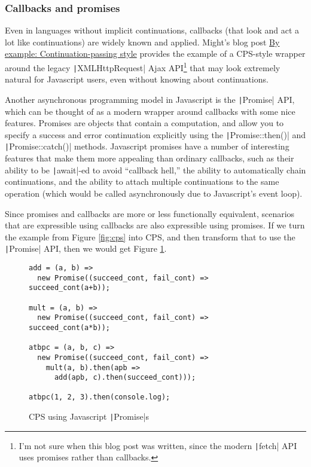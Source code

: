 \documentclass[]{article}
\begin{document}
\subsubsection{Callbacks and promises}
\label{sec:cacb}

Even in languages without implicit continuations, callbacks (that look and act a lot like continuations) are widely known and applied. Might's blog post \href{https://matt.might.net/articles/by-example-continuation-passing-style/}{By example: Continuation-passing style} provides the example of a CPS-style wrapper around the legacy \texttt|XMLHttpRequest| Ajax API\footnote{I'm not sure when this blog post was written, since the modern \texttt|fetch| API uses promises rather than callbacks.} that may look extremely natural for Javascript users, even without knowing about continuations.

Another asynchronous programming model in Javascript is the \texttt|Promise| API, which can be thought of as a modern wrapper around callbacks with some nice features. Promises are objects that contain a computation, and allow you to specify a success and error continuation explicitly using the \texttt|Promise::then()| and \texttt|Promise::catch()| methods. Javascript promises have a number of interesting features that make them more appealing than ordinary callbacks, such as their ability to be \texttt|await|-ed to avoid ``callback hell,'' the ability to automatically chain continuations, and the ability to attach multiple continuations to the same operation (which would be called asynchronously due to Javascript's event loop).

Since promises and callbacks are more or less functionally equivalent, scenarios that are expressible using callbacks are also expressible using promises. If we turn the example from Figure \ref{fig:cps} into CPS, and then transform that to use the \texttt|Promise| API, then we would get Figure \ref{fig:prom}.

\begin{figure}[]
  \centering
\begin{verbatim}
add = (a, b) =>
  new Promise((succeed_cont, fail_cont) => succeed_cont(a+b));

mult = (a, b) =>
  new Promise((succeed_cont, fail_cont) => succeed_cont(a*b));

atbpc = (a, b, c) =>
  new Promise((succeed_cont, fail_cont) =>
    mult(a, b).then(apb =>
      add(apb, c).then(succeed_cont)));

atbpc(1, 2, 3).then(console.log);
\end{verbatim}
  \caption{CPS using Javascript \texttt|Promise|s}
  \label{fig:prom}
\end{figure}
\end{document}
